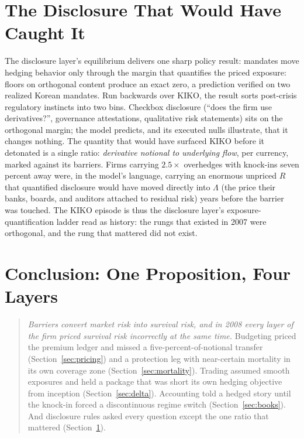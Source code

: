 \documentclass[11pt,a4paper]{article}
\begin{document}
\section{The Disclosure That Would Have Caught It}
\label{sec:disclosure}

The disclosure layer's equilibrium delivers one sharp policy result: mandates move hedging behavior only through the margin that quantifies the priced exposure: floors on orthogonal content produce an exact zero, a prediction verified on two realized Korean mandates. Run backwards over KIKO, the result sorts post-crisis regulatory instincts into two bins. Checkbox disclosure (``does the firm use derivatives?'', governance attestations, qualitative risk statements) sits on the orthogonal margin; the model predicts, and its executed nulls illustrate, that it changes nothing. The quantity that would have surfaced KIKO before it detonated is a single ratio: \emph{derivative notional to underlying flow}, per currency, marked against its barriers. Firms carrying $2.5\times$ overhedges with knock-ins seven percent away were, in the model's language, carrying an enormous unpriced $R$ that quantified disclosure would have moved directly into $\Lambda$ (the price their banks, boards, and auditors attached to residual risk) years before the barrier was touched. The KIKO episode is thus the disclosure layer's exposure-quantification ladder read as history: the rungs that existed in 2007 were orthogonal, and the rung that mattered did not exist.

\section{Conclusion: One Proposition, Four Layers}
\label{sec:conclusion}

\begin{quote}
\emph{Barriers convert market risk into survival risk, and in 2008 every layer of the firm priced survival risk incorrectly at the same time.} Budgeting priced the premium ledger and missed a five-percent-of-notional transfer (Section~\ref{sec:pricing}) and a protection leg with near-certain mortality in its own coverage zone (Section~\ref{sec:mortality}). Trading assumed smooth exposures and held a package that was short its own hedging objective from inception (Section~\ref{sec:delta}). Accounting told a hedged story until the knock-in forced a discontinuous regime switch (Section~\ref{sec:books}). And disclosure rules asked every question except the one ratio that mattered (Section~\ref{sec:disclosure}).
\end{quote}
\end{document}
